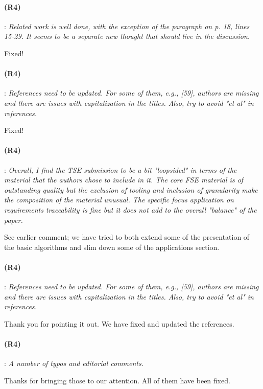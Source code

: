 \documentclass{article}
\begin{document}
\paragraph{(R4)}: \textit{Related work is well done, with the exception of the paragraph on p. 18, lines 15-29. It seems to be a separate new thought that should live in the discussion.}
\vspace{0.05in}

Fixed!

\paragraph{(R4)}: \textit{References need to be updated. For some of them, e.g., [59], authors are missing and there are issues with capitalization in the titles. Also, try to avoid "et al" in references.}
\vspace{0.05in}

Fixed!

\paragraph{(R4)}: \textit{Overall, I find the TSE submission to be a bit "loopsided" in terms of the material that the authors chose to include in it. The core FSE material is of outstanding quality but the exclusion of tooling and inclusion of granularity make the composition of the material unusual. The specific focus application on requirements traceability is fine but it does not add to the overall "balance" of the paper.}
\vspace{0.05in}

See earlier comment; we have tried to both extend some of the presentation of the basic algorithms and slim down some of the applications section.

\paragraph{(R4)}: \textit{References need to be updated. For some of them, e.g., [59], authors are missing and there are issues with capitalization in the titles. Also, try to avoid "et al" in references.}
\vspace{0.05in}

Thank you for pointing it out. We have fixed and updated the references.

\paragraph{(R4)}: \textit{A number of typos and editorial comments.}
\vspace{0.05in}

Thanks for bringing those to our attention. All of them have been fixed.
\end{document}
